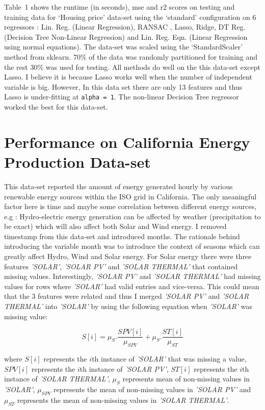 \documentclass[12pt]{article}
\begin{document}
Table~1 shows the runtime (in seconds), mse and r2 scores on testing and training data for `Housing price' data-set using the `standard' configuration on 6 regressors : Lin. Reg. (Linear Regression), RANSAC , Lasso, Ridge, DT Reg. (Decision Tree Non-Linear Regression) and Lin. Reg. Eqn. (Linear Regression using normal equations). The data-set was scaled using the `StandardScaler' method from sklearn. 70\% of the data was randomly partitioned for training and the rest 30\% was used for testing. All methods do well on the this data-set except Lasso. I believe it is because Lasso works well when the number of independent variable is big. However, In this data set there are only 13 features and thus Lasso is under-fitting at \texttt{alpha = 1}. The non-linear Decision Tree regressor worked the best for this data-set.

\section*{Performance on California Energy Production Data-set}

This data-set reported the amount of energy generated hourly by various renewable energy sources within the ISO grid in California. The only meaningful factor here is time and maybe some correlation between different energy sources, e.g : Hydro-electric energy generation can be affected by weather (precipitation to be exact) which will also affect both Solar and Wind energy. I removed timestamp from this data-set and introduced months. The rationale behind introducing the variable month was to introduce the context of seasons which can greatly affect Hydro, Wind and Solar energy. For Solar energy there were three features \textit{'SOLAR'}, \textit{'SOLAR PV'} and \textit{'SOLAR THERMAL'} that contained missing values. Interestingly, \textit{'SOLAR PV'} and \textit{'SOLAR THERMAL'} had missing values for rows where \textit{'SOLAR'} had valid entries and vice-versa. This could mean that the 3 features were related and thus I merged \textit{'SOLAR PV'} and \textit{'SOLAR THERMAL'} into \textit{'SOLAR'} by using the following equation when \textit{'SOLAR'} was missing value:

\begin{equation}
S[i] = \mu_{S} . \frac{SPV[i]}{\mu_{SPV}} + \mu_{S} . \frac{ST[i]}{\mu_{ST}}
\end{equation}

where $S[i]$ represents the $i$th instance of \textit{'SOLAR'} that was missing a value, $SPV[i]$ represents the $i$th instance of \textit{'SOLAR PV'},  $ST[i]$ represents the $i$th instance of \textit{'SOLAR THERMAL'}, $\mu_{S}$ represents mean of non-missing values in \textit{'SOLAR'}, $\mu_{SPV}$ represents the mean of non-missing values in \textit{'SOLAR PV'} and $\mu_{ST}$ represents the mean of non-missing values in \textit{'SOLAR THERMAL'}.
\end{document}
